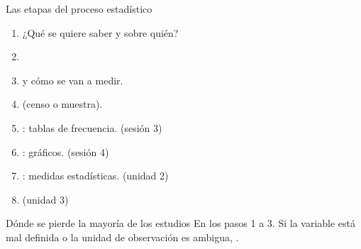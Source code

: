 \documentclass[aspectratio=169,10pt]{beamer}
\begin{document}
\begin{frame}{Las etapas del proceso estadístico}
  \small
  \begin{enumerate}
    \item {} ¿Qué se quiere saber y sobre quién?
    \item {}
    \item {} y cómo se van a medir.
    \item {} (censo o muestra).
    \item {}: tablas de frecuencia. \hfill{\scriptsize (sesión 3)}
    \item {}: gráficos. \hfill{\scriptsize (sesión 4)}
    \item {}: medidas estadísticas. \hfill{\scriptsize (unidad 2)}
    \item {} \hfill{\scriptsize (unidad 3)}
  \end{enumerate}

  \vspace{0.2cm}
  \begin{alertblock}{Dónde se pierde la mayoría de los estudios}
    \footnotesize
    En los pasos 1 a 3. Si la variable está mal definida o la unidad de
    observación es ambigua, .
  \end{alertblock}
\end{frame}
\end{document}
